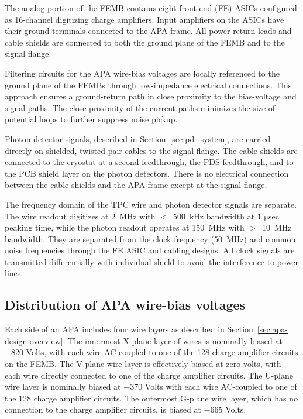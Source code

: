 The analog portion of the FEMB contains eight front-end (FE) ASICs configured as 16-channel 
digitizing charge amplifiers. Input amplifiers on the ASICs have their ground terminals connected 
to the APA frame.  All power-return leads and cable shields 
are connected to both the ground plane of the FEMB and to the signal flange.

Filtering circuits for the APA wire-bias voltages are locally referenced to the ground plane of the FEMBs through low-impedance 
electrical connections. This approach ensures a ground-return path in close proximity to the 
bias-voltage and signal paths. The close proximity of the current paths minimizes the size of potential loops to further 
suppress noise pickup.

Photon detector signals, described in Section~\ref{sec:pd_system}, are carried directly on shielded, 
twisted-pair cables to the signal flange. The cable shields are connected to the 
cryostat at a second feedthrough, the PDS feedthrough, and to the PCB shield layer on the photon detectors. There is no 
electrical connection between the cable shields and the APA frame except at the signal flange.

The frequency domain of the TPC wire and photon detector signals are separate. The wire readout digitizes at 2~MHz 
with $<$~500~kHz bandwidth at 1 $\mathrm{\mu}$sec peaking time, while the photon readout operates at 150~MHz 
with $>$~10~MHz bandwidth. They are separated from the clock frequency (50~MHz) and common noise frequencies 
through the FE ASIC and cabling designs. All clock signals are transmitted differentially with individual shield 
to avoid the interference to power lines. 

%
\subsection{Distribution of APA wire-bias voltages}
\label{subsec:ce_wire_bias}

Each side of an APA includes four wire layers as described in Section~\ref{sec:apa-design-overview}. 
The innermost X-plane layer of wires is nominally biased at +820 Volts, with each wire AC coupled 
to one of the 128 charge amplifier circuits on the FEMB. The V-plane wire layer is effectively biased at zero volts, 
with each wire directly connected to one of the charge amplifier circuits. The U-plane wire layer is nominally 
biased at $-$370 Volts with each wire AC-coupled 
to one of the 128 charge amplifier circuits. The outermost G-plane wire layer,
which has no connection to the charge amplifier circuits, is biased at $-$665 Volts.

